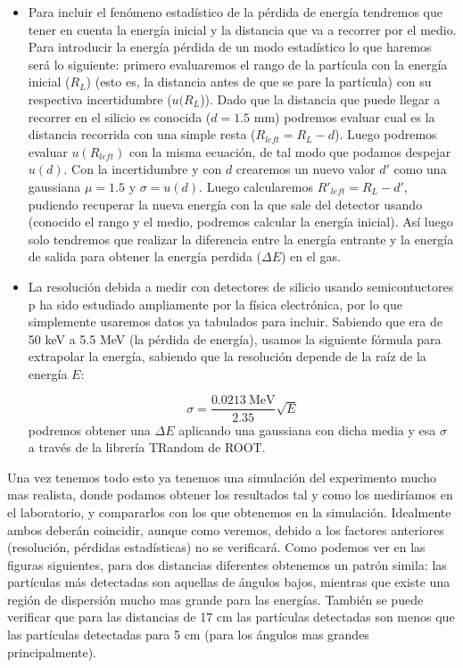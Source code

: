 \documentclass[12pt,a4paper]{article}
\numberwithin{equation}{section}
\numberwithin{figure}{section}
\begin{document}
\begin{itemize}
    \item Para incluir el fenómeno estadístico de la pérdida de energía tendremos que tener en cuenta la energía inicial y la distancia que va a recorrer por el medio. Para introducir la energía pérdida de un modo estadístico lo que haremos será lo siguiente: primero evaluaremos el rango de la partícula con la energía inicial ($R_L$) (esto es, la distancia antes de que se pare la partícula) con su respectiva incertidumbre ($u(R_L$)). Dado que la distancia que puede llegar a recorrer en el silicio es conocida ($d=1.5$ mm) podremos evaluar cual es la distancia recorrida con una simple resta ($R_{left}=R_L-d$). Luego podremos evaluar $u(R_{left})$ con la misma ecuación, de tal modo que podamos despejar $u(d)$. Con la incertidumbre y con $d$ crearemos un nuevo valor $d'$ como una gaussiana $\mu=1.5$ y $\sigma=u(d)$. Luego calcularemos $R'_{left}=R_{L}-d'$, pudiendo recuperar la nueva energía con la que sale del detector usando (conocido el rango y el medio, podremos calcular la energía inicial). Así luego solo tendremos que realizar la diferencia entre la energía entrante y la energía de salida para obtener la energía perdida ($\Delta E$) en el gas. 
    
    \item La resolución debida a medir con detectores de silicio usando semicontuctores p ha sido estudiado ampliamente por la física electrónica, por lo que simplemente usaremos datos ya tabulados para incluir. Sabiendo que era de 50 keV a 5.5 MeV (la pérdida de energía), usamos la siguiente fórmula para extrapolar la energía, sabiendo que la resolución depende de la raíz de la energía $E$: 
    
    \begin{equation}
        \sigma = \frac{0.0213 \  \text{MeV}}{2.35} \sqrt{E}
    \end{equation}
    podremos obtener una $\Delta E$ aplicando una gaussiana con dicha media y esa $\sigma$ a través de la librería TRandom de ROOT. 

\end{itemize}




Una vez tenemos todo esto ya tenemos una simulación del experimento mucho mas realista, donde podamos obtener los resultados tal y como los mediríamos en el laboratorio, y compararlos con los que obtenemos en la simulación. Idealmente ambos deberán coincidir, aunque como veremos, debido a los factores anteriores (resolución, pérdidas estadísticas) no se verificará. Como podemos ver en las figuras siguientes, para dos distancias diferentes obtenemos un patrón simila: las partículas más detectadas son aquellas de ángulos bajos, mientras que existe una región de dispersión mucho mas grande para las energías. También se puede verificar que para las distancias de 17 cm las partículas detectadas son menos que las partículas detectadas para 5 cm (para los ángulos mas grandes principalmente). 
\end{document}
